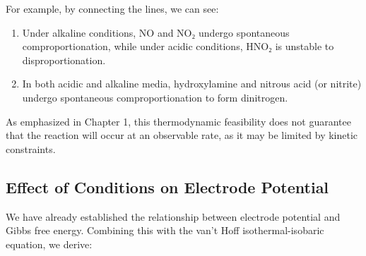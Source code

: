 \begin{example}

For example, by connecting the lines, we can see:
\begin{enumerate}
  \item Under alkaline conditions, NO and NO₂ undergo spontaneous comproportionation, while under acidic conditions, HNO₂ is unstable to disproportionation.
  \item In both acidic and alkaline media, hydroxylamine and nitrous acid (or nitrite) undergo spontaneous comproportionation to form dinitrogen.
\end{enumerate}

As emphasized in Chapter 1, this thermodynamic feasibility does not guarantee that the reaction will occur at an observable rate, as it may be limited by kinetic constraints.

\end{example}

\subsection{Effect of Conditions on Electrode Potential}

We have already established the relationship between electrode potential and Gibbs free energy. Combining this with the van’t Hoff isothermal-isobaric equation, we derive:

